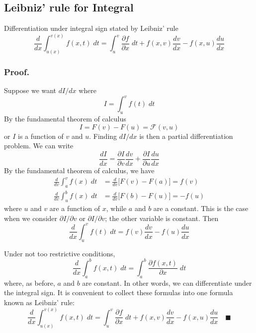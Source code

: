 \documentclass[../../Main.tex]{subfiles}
\begin{document}
\subsection*{Leibniz’ rule for Integral}
Differentiation under integral sign stated by Leibniz' rule
\begin{equation*}
    \frac{d}{dx}\int_{u(x)}^{v(x)}f(x,t)\;dt=\int_{u}^{v}\frac{\partial f}{\partial x}\;dt + f(x,v)\frac{dv}{dx}-f(x,u)\frac{du}{dx}
\end{equation*}

\subsubsection*{Proof.} Suppose we want $dI/dx$ where
\begin{equation*}
    I=\int_{u }^{v }f(t)\;dt
\end{equation*}
By the fundamental theorem of calculus
\begin{equation*}
    I=F(v)-F(u)=\mathcal{F}(v,u)
\end{equation*}
or $I$ is a function of $v$ and $u$. Finding $dI/dx$ is then a partial diﬀerentiation problem. We can write
\begin{equation*}
    \frac{dI}{dx}=\frac{\partial I}{\partial v}\frac{dv}{dx}+\frac{\partial I}{\partial u}\frac{du}{dx}
\end{equation*}
By the fundamental theorem of calculus, we have 
\begin{align*}
    \frac{d}{dv}\int_{a}^{v}f(x)\;dt&=\frac{d}{dv}\bigl[F(v)-F(a)\bigr]=f(v)\\
    \frac{d}{dv}\int_{u}^{b}f(x)\;dt&=\frac{d}{dv}\bigl[F(b)-F(u)\bigr]=-f(u)
\end{align*}
where $u$ and $v$ are a function of $x$, while $a$ and $b$ are a constant. This is the case when we consider $\partial I/\partial v$ or $\partial I/\partial v$; the other variable is constant. Then 
\begin{equation*}
    \frac{d}{dx}\int_{u }^{v }f(t)\;dt=f(v)\frac{dv}{dx}-f(u)\frac{du}{dx}
\end{equation*}

Under not too restrictive conditions, 
\begin{equation*}
    \frac{d}{dx}\int_{a }^{b }f(x,t)\;dt =\int_{a }^{b }\frac{\partial f(x,t)}{\partial x}\;dt
\end{equation*}
where, as before, $a$ and $b$ are constant. In other words, we can differentiate under the integral sign. It is convenient to collect these formulas into one formula known as Leibniz' rule:
\begin{equation*}
    \frac{d}{dx}\int_{u(x)}^{v(x)}f(x,t)\;dt=\int_{u}^{v}\frac{\partial f}{\partial x}\;dt + f(x,v)\frac{dv}{dx}-f(x,u)\frac{du}{dx}\quad\blacksquare
\end{equation*}
\end{document}
